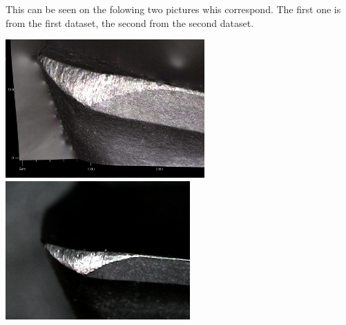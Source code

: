 \documentclass{scrartcl}
\begin{document}
This can be seen on the folowing two pictures whis correspond. The first one is from the first dataset, the second from the second dataset.

\includegraphics[height=2.083333in, keepaspectratio=true]{./Second_handmade_dataset/t50b-img.PNG}\includegraphics[height=2.083333in, keepaspectratio=true]{./Second_handmade_dataset/b_005_p_010_s.jpg}
\end{document}
